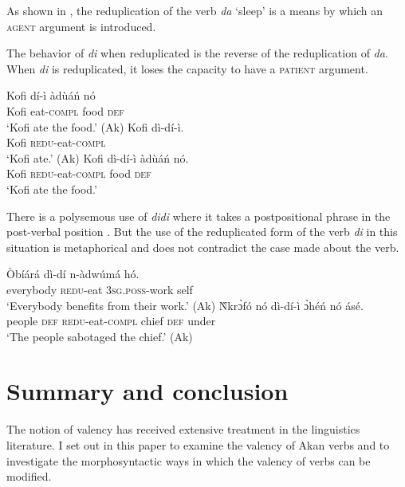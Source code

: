 \documentclass[output=paper]{langsci/langscibook}
\begin{document}
As shown in , the reduplication of the verb \textit{da} `sleep' is a means by which an \textsc{agent} argument is introduced.

The behavior of \textit{di} when reduplicated is the reverse of the reduplication of \textit{da}. When \textit{di} is reduplicated, it loses the capacity to have a \textsc{patient} argument.

\ea\label{ex:48.osam}
\ea\label{ex:48a.osam}
\gll  Kofi  dí-ì    àdùáń    nó\\
       Kofi  eat-\textsc{compl}  food    \textsc{def}\\
\glt   `Kofi ate the food.' (Ak)
\ex\label{ex:48b.osam}
\gll Kofi  dì-dí-ì.\\
       Kofi  \textsc{redu}-eat-\textsc{compl}\\
\glt   `Kofi ate.' (Ak)
\ex\label{ex:48c.osam}
\gll   Kofi  dì-dí-ì      àdùáń    nó.\\
       Kofi  \textsc{redu}-eat-\textsc{compl}  food    \textsc{def}\\
\glt   `Kofi ate the food.'
\z 
\z 


There is a polysemous use of \textit{didi} where it takes a postpositional phrase in the post-verbal position . But the use of the reduplicated form of the verb \textit{di} in this situation is metaphorical and does not contradict the case made about the verb.

\ea\label{ex:49.osam}
\ea\label{ex:49a.osam}
\gll  Òbíárá    dì-dí    n-àdwúmá    hó.\\
       everybody  \textsc{redu}-eat  \textsc{3sg.poss}-work  self\\
\glt   `Everybody benefits from their work.' (Ak)
\ex\label{ex:49b.osam}
\gll    \`{N}krɔ̀fó  nó  dì-dí-ì      ɔ̀héń   nó  ásé.\\
       people  \textsc{def}  \textsc{redu}-eat-\textsc{compl}  chief  \textsc{def}  under\\
\glt   `The people sabotaged the chief.' (Ak)
\z 
\z 


\section{Summary and conclusion}\label{§7:summary.osam}

The notion of valency has received extensive treatment in the linguistics literature. I set out in this paper to examine the valency of Akan verbs and to investigate the morphosyntactic ways in which the valency of verbs can be modified. 
\end{document}
